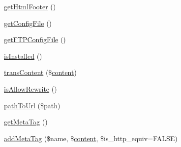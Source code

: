\begin{DoxyCompactItemize}
\item 
\hyperlink{classContext_ae7bb6879f84366eea76da3a7bf6a40bd}{get\+Html\+Footer} ()
\item 
\hyperlink{classContext_a7ac0928e07cfc7f19f9a7341c50b4811}{get\+Config\+File} ()
\item 
\hyperlink{classContext_ab7bb799f55be29174c8a15659dab823a}{get\+F\+T\+P\+Config\+File} ()
\item 
\hyperlink{classContext_a5a8714e3a0f9d4722a31ce73017c6613}{is\+Installed} ()
\item 
\hyperlink{classContext_a4767b003bd726a994b1bf6bf68a3bb7e}{trans\+Content} (\$\hyperlink{classcontent}{content})
\item 
\hyperlink{classContext_aa11482b69f0892e9e8013e08c9914ff4}{is\+Allow\+Rewrite} ()
\item 
\hyperlink{classContext_a6012ceb6e62fc99b0e2b24e475ba4da7}{path\+To\+Url} (\$path)
\item 
\hyperlink{classContext_a8ee4ad4396e92a54d2aa7d079771619f}{get\+Meta\+Tag} ()
\item 
\hyperlink{classContext_aeae29df3bedc1f90a497d34543a08f7f}{add\+Meta\+Tag} (\$name, \$\hyperlink{classcontent}{content}, \$is\+\_\+http\+\_\+equiv=F\+A\+L\+SE)
\end{DoxyCompactItemize}
